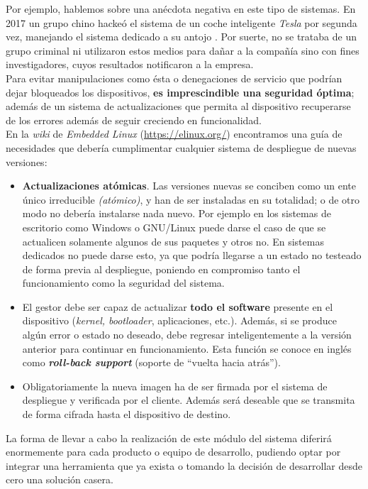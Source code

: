Por ejemplo, hablemos sobre una anécdota negativa en este tipo de sistemas. En 2017 un grupo chino hackeó el sistema de un coche inteligente \textit{Tesla} por segunda vez, manejando el sistema dedicado a su antojo \cite{tesla-system-hacked}. Por suerte, no se trataba de un grupo criminal ni utilizaron estos medios para dañar a la compañía sino con fines investigadores, cuyos resultados notificaron a la empresa.\\

Para evitar manipulaciones como ésta o denegaciones de servicio que podrían dejar bloqueados los dispositivos, \textbf{es imprescindible una seguridad óptima}; además de un sistema de actualizaciones que permita al dispositivo recuperarse de los errores además de seguir creciendo en funcionalidad.\\

En la \textit{wiki} de \textit{Embedded Linux} (\url{https://elinux.org/}) encontramos una guía de necesidades que debería cumplimentar cualquier sistema de despliegue de nuevas versiones:

\begin{itemize}
	\item \textbf{Actualizaciones atómicas}. Las versiones nuevas se conciben como un ente único irreducible \textit{(atómico)}, y han de ser instaladas en su totalidad; o de otro modo no debería instalarse nada nuevo. Por ejemplo en los sistemas de escritorio como Windows o GNU/Linux puede darse el caso de que se actualicen solamente algunos de sus paquetes y otros no. En sistemas dedicados no puede darse esto, ya que podría llegarse a un estado no testeado de forma previa al despliegue, poniendo en compromiso tanto el funcionamiento como la seguridad del sistema.
	\item El gestor debe ser capaz de actualizar \textbf{todo el software} presente en el dispositivo (\textit{kernel, bootloader}, aplicaciones, etc.). Además, si se produce algún error o estado no deseado, debe regresar inteligentemente a la versión anterior para continuar en funcionamiento. Esta función se conoce en inglés como \textbf{\textit{roll-back support}} (soporte de ``vuelta hacia atrás'').
	\item Obligatoriamente la nueva imagen ha de ser firmada por el sistema de despliegue y verificada por el cliente. Además será deseable que se transmita de forma cifrada hasta el dispositivo de destino.
\end{itemize}

La forma de llevar a cabo la realización de este módulo del sistema diferirá enormemente para cada producto o equipo de desarrollo, pudiendo optar por integrar una herramienta que ya exista o tomando la decisión de desarrollar desde cero una solución casera.\\

